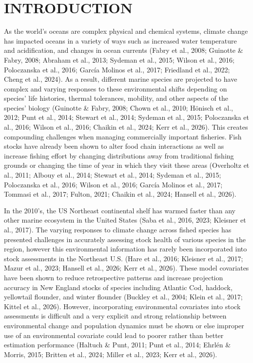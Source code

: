 \documentclass[
  12pt,
]{article}
\begin{document}
\section{INTRODUCTION}\label{introduction}

As the world's oceans are complex physical and chemical systems, climate change has impacted oceans in a variety of ways such as increased water temperature and acidification, and changes in ocean currents (Fabry et al., 2008; Guinotte \& Fabry, 2008; Abraham et al., 2013; Sydeman et al., 2015; Wilson et al., 2016; Poloczanska et al., 2016; García Molinos et al., 2017; Friedland et al., 2022; Cheng et al., 2024). As a result, different marine species are projected to have complex and varying responses to these environmental shifts depending on species' life histories, thermal tolerances, mobility, and other aspects of the species' biology (Guinotte \& Fabry, 2008; Chown et al., 2010; Hönisch et al., 2012; Punt et al., 2014; Stewart et al., 2014; Sydeman et al., 2015; Poloczanska et al., 2016; Wilson et al., 2016; Chaikin et al., 2024; Kerr et al., 2026). This creates compounding challenges when managing commercially important fisheries. Fish stocks have already been shown to alter food chain interactions as well as increase fishing effort by changing distributions away from traditional fishing grounds or changing the time of year in which they visit these areas (Overholtz et al., 2011; Albouy et al., 2014; Stewart et al., 2014; Sydeman et al., 2015; Poloczanska et al., 2016; Wilson et al., 2016; García Molinos et al., 2017; Tommasi et al., 2017; Fulton, 2021; Chaikin et al., 2024; Hansell et al., 2026).

In the 2010's, the US Northeast continental shelf has warmed faster than any other marine ecosystem in the United States (Saba et al., 2016, 2023; Kleisner et al., 2017). The varying responses to climate change across fished species has presented challenges in accurately assessing stock health of various species in the region, however this environmental information has rarely been incorporated into stock assessments in the Northeast U.S. (Hare et al., 2016; Kleisner et al., 2017; Mazur et al., 2023; Hansell et al., 2026; Kerr et al., 2026). These model covariates have been shown to reduce retrospective patterns and increase projection accuracy in New England stocks of species including Atlantic Cod, haddock, yellowtail flounder, and winter flounder (Buckley et al., 2004; Klein et al., 2017; Kittel et al., 2026). However, incorporating environmental covariates into stock assessments is difficult and a very explicit and strong relationship between environmental change and population dynamics must be shown or else improper use of an environmental covariate could lead to poorer rather than better estimation performance (Haltuch \& Punt, 2011; Punt et al., 2014; Ehrlén \& Morris, 2015; Britten et al., 2024; Miller et al., 2023; Kerr et al., 2026).
\end{document}
